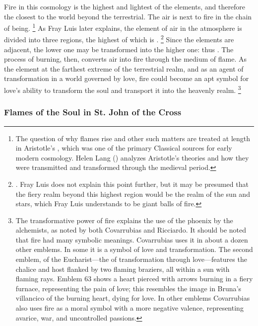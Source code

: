 Fire in this cosmology is the highest and lightest of the elements, and therefore the closest to the world beyond the terrestrial.
The air is next to fire in the chain of being.%
	\footnote{%
	The question of why flames rise and other such matters are treated at length in Aristotle's , which was one of the primary Classical sources for early modern cosmology.
	Helen Lang () analyzes Aristotle's theories and how they were transmitted and transformed through the medieval period.
	}
As Fray Luis later explains, the element of air in the atmosphere is divided into three regions, the highest of which is .%
	\footnote{%
	\autocite[207]{LuisdeGranada:Simbolo}.
	Fray Luis does not explain this point further, but it may be presumed that the fiery realm beyond this highest region would be the realm of the sun and stars, which Fray Luis understands to be giant balls of fire.
	}
Since the elements are adjacent, the lower one may be transformed into the higher one: thus .%
	\autocite[205]{LuisdeGranada:Simbolo}
The process of burning, then, converts air into fire through the medium of flame.
As the element at the farthest extreme of the terrestrial realm, and as an agent of transformation in a world governed by love, fire could become an apt symbol for love's ability to transform the soul and transport it into the heavenly realm.%
	\footnote{%
	The transformative power of fire explains the use of the phoenix by the alchemists, as noted by both Covarrubias and Ricciardo.
	It should be noted that fire had many symbolic meanings.
	Covarrubias uses it in about a dozen other emblems.
	In some it is a symbol of love and transformation. 
        The second emblem, of the Eucharist---the  of transformation through love---features the chalice and host flanked by two flaming braziers, all within a sun with flaming rays.
	Emblem 63 shows a heart pierced with arrows burning in a fiery furnace, representing the pain of love; this resembles the image in Bruna's villancico of the burning heart, dying for love.
	In other emblems Covarrubias also uses fire as a moral symbol with a more negative valence, representing avarice, war, and uncontrolled passions.
	}

\subsubsection{Flames of the Soul in St. John of the Cross}

